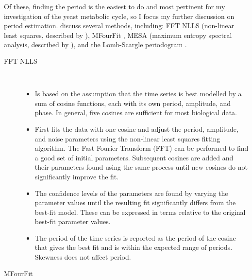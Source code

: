 Of these, finding the period is the easiest to do and most pertinent for my investigation of the yeast metabolic cycle, so I focus my further discussion on period estimation.
\textcite{zielinskiStrengthsLimitationsPeriod2014} discuss several methods, including: FFT NLLS (non-linear least squares, described by \textcite{straumeLeastSquaresAnalysisFluorescence2002}), MFourFit \parencite{edwardsQuantitativeAnalysisRegulatory2010}, MESA (maximum entropy spectral analysis, described by \textcite{burgRelationshipMaximumEntropy1972}), and the Lomb-Scargle periodogram \parencite{lombLeastsquaresFrequencyAnalysis1976}.

\begin{description}
    \item [FFT NLLS] \hfill \\

        \begin{itemize}
          \item Is based on the assumption that the time series is best modelled by a sum of cosine functions, each with its own period, amplitude, and phase.
                In general, five cosines are sufficient for most biological data.
          \item First fits the data with one cosine and adjust the period, amplitude, and noise parameters using the non-linear least squares fitting algorithm.
                The Fast Fourier Transform (FFT) can be performed to find a good set of initial parameters.
                Subsequent cosines are added and their parameters found using the same process until new cosines do not significantly improve the fit.
          \item The confidence levels of the parameters are found by varying the parameter values until the resulting fit significantly differs from the best-fit model.
                These can be expressed in terms relative to the original best-fit parameter values.
          \item The period of the time series is reported as the period of the cosine that gives the best fit and is within the expected range of periods.
                Skewness does not affect period.
        \end{itemize}

    \item [MFourFit] \hfill \\


\end{description}
